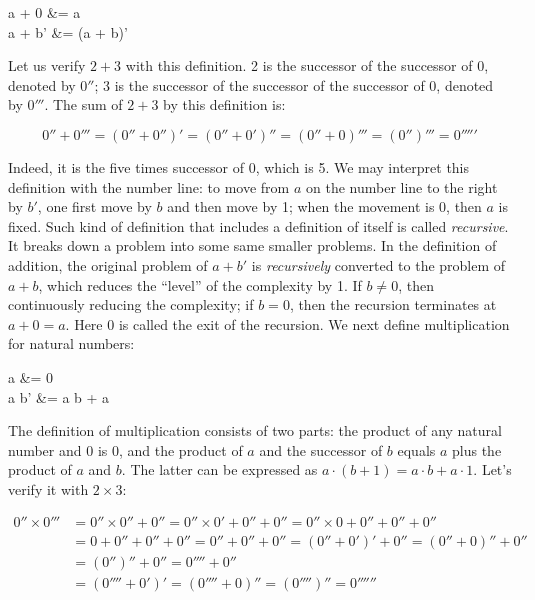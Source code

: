 \documentclass[b5paper]{article}
\begin{document}
\be
\begin{laligned}
a + 0  &= a \\
a + b' &= (a + b)'
\end{laligned}
\label{eq:peano-add}
\ee

Let us verify $2+3$ with this definition. 2 is the successor of the successor of 0, denoted by $0''$; 3 is the successor of the successor of the successor of 0, denoted by $0'''$. The sum of $2 + 3$ by this definition is:

\[
0'' + 0''' = (0'' + 0'')' = (0'' + 0')'' = (0'' + 0)''' = (0'')''' = 0'''''
\]

Indeed, it is the five times successor of 0, which is 5. We may interpret this definition with the number line: to move from $a$ on the number line to the right by $b'$, one first move by $b$ and then move by 1; when the movement is 0, then $a$ is fixed. Such kind of definition that includes a definition of itself is called {\em recursive}. It breaks down a problem into some same smaller problems. In the definition of addition, the original problem of $a + b'$ is {\em recursively} converted to the problem of $a + b$, which reduces the \enquote{level} of the complexity by 1. If $b \ne 0$, then continuously reducing the complexity; if $b = 0$, then the recursion terminates at $a + 0 = a$. Here 0 is called the exit of the recursion. We next define multiplication for natural numbers:

\be
\begin{laligned}
a  &= 0 \\
a \cdot b' &= a \cdot b + a
\end{laligned}
\label{eq:peano-multiply}
\ee

The definition of multiplication consists of two parts: the product of any natural number and 0 is 0, and the product of $a$ and the successor of $b$ equals $a$ plus the product of $a$ and $b$. The latter can be expressed as $a \cdot (b+1) = a \cdot b + a \cdot 1$. Let's verify it with $2 \times 3$:

\begin{align*}
0'' \times 0''' & = 0'' \times 0'' + 0'' = 0'' \times 0' + 0'' + 0'' = 0'' \times 0 + 0'' + 0'' + 0'' \\
                & = 0 + 0'' + 0'' + 0'' = 0'' + 0'' + 0'' = (0'' + 0')' + 0'' = (0'' + 0)'' + 0'' \\
                & = (0'')'' + 0'' = 0'''' + 0'' \\
                & = (0'''' + 0')' = (0'''' + 0)'' = (0'''')'' = 0''''''
\end{align*}
\end{document}
